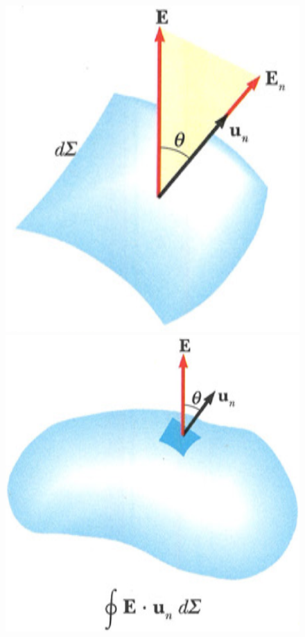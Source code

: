\documentclass[class=book, crop=false, oneside, 12pt]{standalone}
\begin{document}
\begin{figure}[h]
    \includegraphics[scale=0.4]{flusso_superficie.png}
    \includegraphics[scale=0.4]{flusso_superficie_chiusa.png}

\end{figure}
\end{document}
